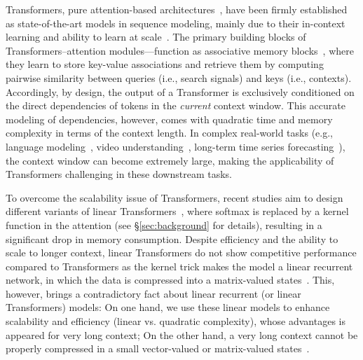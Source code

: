 \documentclass{article}
\newcommand{\citep}{\parencite}
\begin{document}
\lettrine[lines=3]{T}{}ransformers, pure attention-based architectures~\citep{transformers}, have been firmly established as state-of-the-art models in sequence modeling, mainly due to their in-context learning and ability to learn at scale~\citep{kaplan2020scaling}. The primary building blocks of Transformers–attention modules—function as associative memory blocks~\citep{bietti2024birth}, where they learn to store key-value associations and retrieve them by computing pairwise similarity between queries (i.e., search signals) and keys (i.e., contexts). Accordingly, by design, the output of a Transformer is exclusively conditioned on the direct dependencies of tokens in the \emph{current} context window. This accurate modeling of dependencies, however, comes with quadratic time and memory complexity in terms of the context length. In complex real-world tasks (e.g., language modeling~\citep{liu2024lost}, video understanding~\citep{wu2019long}, long-term time series forecasting~\citep{zhou2021informer}), the context window can become extremely large, making the applicability of Transformers challenging in these downstream tasks.  

To overcome the scalability issue of Transformers, recent studies aim to design different variants of linear Transformers~\citep{katharopoulos2020transformers, kacham2024polysketchformer, yang2024gatedattn}, where softmax is replaced by a kernel function in the attention (\textcolor{c1}{see \S}\ref{sec:background} \textcolor{c1}{for details}), resulting in a significant drop in memory consumption. Despite efficiency and the ability to scale to longer context, linear Transformers do not show competitive performance compared to Transformers as the kernel trick makes the model a linear recurrent network, in which the data is compressed into a matrix-valued states~\citep{katharopoulos2020transformers}. This, however, brings a contradictory fact about linear recurrent (or linear Transformers) models: On one hand, we use these linear models to enhance scalability and efficiency (linear vs. quadratic complexity), whose advantages is appeared for very long context; On the other hand, a very long context cannot be properly compressed in a small vector-valued or matrix-valued states~\citep{wang2024longssm}. 
\end{document}
